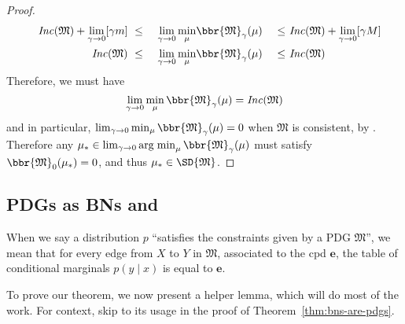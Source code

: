 \documentclass{article}
\theoremstyle{plain}
\theoremstyle{definition}
\theoremstyle{remark}
\DeclareMathOperator*{\argmin}{arg\;min}
\newcommand{\dg}[1]{\mathfrak{#1}}
\newcommand\Inc{\mathit{Inc}}
\numberwithin{equation}{section}
\begin{document}
\begin{proof}
\begin{alignat*}{4}
		&&
			\Inc(\dg M) + \lim_{\gamma\to 0} [\gamma\lb ]&~\leq~& 
				\lim_{\gamma\to 0}\min_{\mu } &\bbr{\dg M }_\gamma(\mu)  &~\leq~&  
				\Inc(\dg M) + \lim_{\gamma\to 0} [\gamma\ub] \\
		&&
			\Inc(\dg M) &~\leq~& 
				\lim_{\gamma\to 0}\min_\mu & \bbr{\dg M }_\gamma(\mu)  &~\leq~&  
				 \Inc(\dg M)\\
		\end{alignat*}
		Therefore, we must have
		\[\lim_{\gamma\to 0}\min_\mu \bbr{\dg M }_\gamma(\mu) = \Inc(\dg M) \]
		and in particular, $\lim_{\gamma\to 0}\min_\mu \bbr{\dg M }_\gamma(\mu) = 0$ when $\dg M$ is consistent, by . Therefore any $\mu_* \in \lim_{\gamma \to 0}\argmin_\mu \bbr{\dg M}_\gamma(\mu)$ must satisfy $\bbr{\dg M}_0(\mu_*) = 0$, and thus $\mu_* \in \SD{\dg M}$.
	\end{proof}


\subsection{PDGs as BNs and }


When we say a distribution $p$ ``satisfies the constraints given by a PDG $\dg M$'', we mean that for every edge from $X$ to $Y$ in $\dg M$, associated to the cpd $\mathbf e$, the table of conditional marginals $p(y \mid x)$ is equal to $\mathbf e$.

To prove our theorem, we now present a helper lemma, which will do most of the work. For context, skip to its usage in the proof of Theorem~\ref{thm:bns-are-pdgs}.
\end{document}
